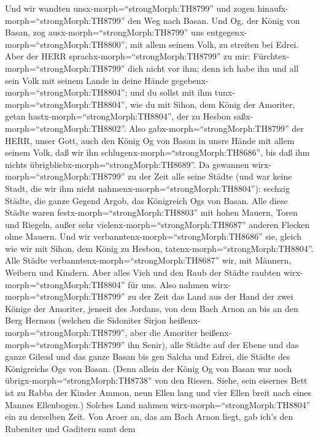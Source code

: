  Und wir wandten unsx-morph=``strongMorph:TH8799'' und zogen
hinaufx-morph=``strongMorph:TH8799'' den Weg nach Basan. Und Og, der
König von Basan, zog ausx-morph=``strongMorph:TH8799'' uns
entgegenx-morph=``strongMorph:TH8800'', mit allem seinem Volk, zu
streiten bei Edrei.  Aber der HERR
sprachx-morph=``strongMorph:TH8799'' zu mir:
Fürchtex-morph=``strongMorph:TH8799'' dich nicht vor ihm; denn ich habe
ihn und all sein Volk mit seinem Lande in deine Hände
gegebenx-morph=``strongMorph:TH8804''; und du sollst mit ihm
tunx-morph=``strongMorph:TH8804'', wie du mit Sihon, dem König der
Amoriter, getan hastx-morph=``strongMorph:TH8804'', der zu Hesbon
saßx-morph=``strongMorph:TH8802''.  Also
gabx-morph=``strongMorph:TH8799'' der HERR, unser Gott, auch den König
Og von Basan in unsre Hände mit allem seinem Volk, daß wir ihn
schlugenx-morph=``strongMorph:TH8686'', bis daß ihm nichts
übrigbliebx-morph=``strongMorph:TH8689''.  Da gewannen
wirx-morph=``strongMorph:TH8799'' zu der Zeit alle seine Städte (und war
keine Stadt, die wir ihm nicht nahmenx-morph=``strongMorph:TH8804''):
sechzig Städte, die ganze Gegend Argob, das Königreich Ogs von Basan.
 Alle diese Städte waren festx-morph=``strongMorph:TH8803''
mit hohen Mauern, Toren und Riegeln, außer sehr
vielenx-morph=``strongMorph:TH8687'' anderen Flecken ohne Mauern.
 Und wir verbanntenx-morph=``strongMorph:TH8686'' sie,
gleich wie wir mit Sihon, dem König zu Hesbon,
tatenx-morph=``strongMorph:TH8804''. Alle Städte
verbanntenx-morph=``strongMorph:TH8687'' wir, mit Männern, Weibern und
Kindern.  Aber alles Vieh und den Raub der Städte raubten
wirx-morph=``strongMorph:TH8804'' für uns.  Also nahmen
wirx-morph=``strongMorph:TH8799'' zu der Zeit das Land aus der Hand der
zwei Könige der Amoriter, jenseit des Jordans, von dem Bach Arnon an bis
an den Berg Hermon  (welchen die Sidoniter Sirjon
heißenx-morph=``strongMorph:TH8799'', aber die Amoriter
heißenx-morph=``strongMorph:TH8799'' ihn Senir),  alle
Städte auf der Ebene und das ganze Gilead und das ganze Basan bis gen
Salcha und Edrei, die Städte des Königreichs Ogs von Basan.
 (Denn allein der König Og von Basan war noch
übrigx-morph=``strongMorph:TH8738'' von den Riesen. Siehe, sein eisernes
Bett ist zu Rabba der Kinder Ammon, neun Ellen lang und vier Ellen breit
nach eines Mannes Ellenbogen.)  Solches Land nahmen
wirx-morph=``strongMorph:TH8804'' ein zu derselben Zeit. Von Aroer an,
das am Bach Arnon liegt, gab ich's den Rubeniter und Gaditern samt dem
